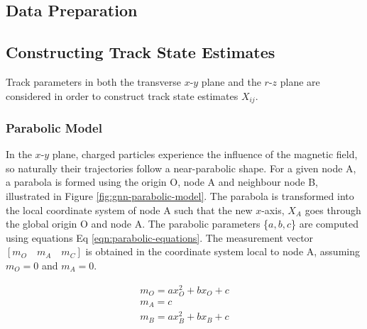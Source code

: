 \subsection{Data Preparation}





\subsection{Constructing Track State Estimates}
\label{constructing-track-states}

Track parameters in both the transverse $x$-$y$ plane and the $r$-$z$ plane are considered in order to construct track state estimates $X_{ij}$.


\subsubsection{Parabolic Model}
\label{parabolic-state}

In the $x$-$y$ plane, charged particles experience the influence of the magnetic field, so naturally their trajectories follow a near-parabolic shape. For a given node A, a parabola is formed using the origin O, node A and neighbour node B, illustrated in Figure \ref{fig:gnn-parabolic-model}. The parabola is transformed into the local coordinate system of node A such that the new $x$-axis, $X_A$ goes through the global origin O and node A. The parabolic parameters \{$a, b, c$\} are computed using equations Eq \eqref{eqn:parabolic-equations}. The measurement vector $[m_O \quad m_A \quad m_C]$ is obtained in the coordinate system local to node A, assuming $m_O = 0$ and $m_A = 0$.

\begin{equation}
\begin{aligned}
m_O = ax_{O}^{2} + bx_O + c \\
m_A = c \\
m_B = ax_{B}^{2} + bx_B + c
\end{aligned}
\label{eqn:parabolic-equations}
\end{equation}

